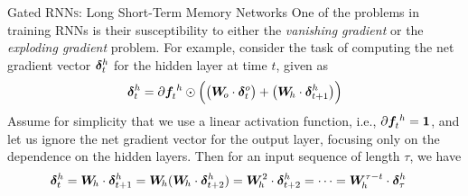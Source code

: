 %
\begin{frame}{Gated RNN\textsc{s}: Long Short-Term Memory Networks}
%
One of the problems in training RNNs is their susceptibility 
to either the {\em vanishing gradient} or the {\em exploding gradient} problem. For example,
consider the task of computing the net gradient vector ${\bm \delta}_t^h$ for
the hidden layer at time $t$, given as
\begin{align*}
    {\bm \delta}_t^h = \partial{\boldsymbol f}^{\;h}_t \odot \Bigl(\bigl({\boldsymbol W}_{\!o} \cdot
        {\bm \delta}_t^o \bigr) + \bigl({\boldsymbol W}_{\!h} \cdot {\bm \delta}_{t+1}^h
    \bigr) \Bigr)
\end{align*}
Assume for simplicity that we use a linear
activation function, i.e., $\partial {\boldsymbol f}^{\;h}_t = \mathbf{1}$, 
and let us ignore the net gradient vector for the
output layer, focusing only on the dependence on the hidden layers.
Then for an input sequence of
length $\tau$, we have
\begin{align*}
    {\bm \delta}_t^h & = {\boldsymbol W}_{\!h} \cdot {\bm \delta}_{t+1}^h
     = {\boldsymbol W}_{\!h} ({\boldsymbol W}_{\!h} \cdot {\bm \delta}_{t+2}^h) = {\boldsymbol W}_{\!h}^2 \cdot
    {\bm \delta}_{t+2}^h
    = \cdots = {\boldsymbol W}_{\!h}^{\tau-t} \cdot {\bm \delta}_{\tau}^h
\end{align*}
\end{frame}

